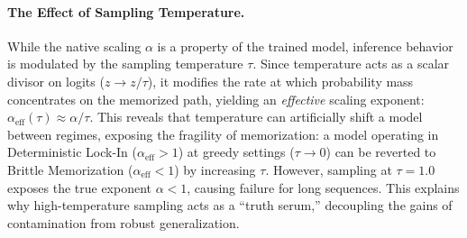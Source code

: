 \paragraph{The Effect of Sampling Temperature.}
While the native scaling $\alpha$ is a property of the trained model, inference behavior is modulated by the sampling temperature $\tau$.
Since temperature acts as a scalar divisor on logits ($z \to z/\tau$), it modifies the rate at which probability mass concentrates on the memorized path, yielding an \textit{effective} scaling exponent:
$\alpha_{\mathrm{eff}}(\tau) \approx \alpha / \tau$.
This reveals that temperature can artificially shift a model between regimes, exposing the fragility of memorization: a model operating in Deterministic Lock-In ($\alpha_{\mathrm{eff}} > 1$) at greedy settings ($\tau \to 0$) can be reverted to Brittle Memorization ($\alpha_{\mathrm{eff}} < 1$) by increasing $\tau$.
However, sampling at $\tau=1.0$ exposes the true exponent $\alpha < 1$, causing failure for long sequences.
This explains why high-temperature sampling acts as a ``truth serum,'' decoupling the gains of contamination from robust generalization.


